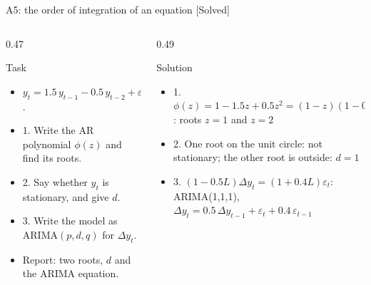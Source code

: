 \begin{frame}{A5: the order of integration of an equation [Solved]}
\itemsize{\scriptsize}
\begin{columns}[T]
\begin{column}{0.47\textwidth}
\begin{block}{Task}
\begin{itemize}
    \item $y_t = 1.5\,y_{t-1} - 0.5\,y_{t-2} + \varepsilon_t + 0.4\,\varepsilon_{t-1}$.
    \item 1. Write the AR polynomial $\phi(z)$ and find its roots.
    \item 2. Say whether $y_t$ is stationary, and give $d$.
    \item 3. Write the model as ARIMA$(p,d,q)$ for $\Delta y_t$.
    \item Report: two roots, $d$ and the ARIMA equation.
\end{itemize}
\end{block}
\end{column}
\begin{column}{0.49\textwidth}
\begin{exampleblock}{Solution}
\begin{itemize}
    \item 1. $\phi(z) = 1 - 1.5z + 0.5z^2 = (1 - z)(1 - 0.5z)$: roots $z = 1$ and $z = 2$
    \item 2. One root on the unit circle: not stationary; the other root is outside: $d = 1$
    \item 3. $(1 - 0.5L)\Delta y_t = (1 + 0.4L)\varepsilon_t$: ARIMA(1,1,1), $\Delta y_t = 0.5\,\Delta y_{t-1} + \varepsilon_t + 0.4\,\varepsilon_{t-1}$
\end{itemize}
\end{exampleblock}
\end{column}
\end{columns}
\end{frame}

